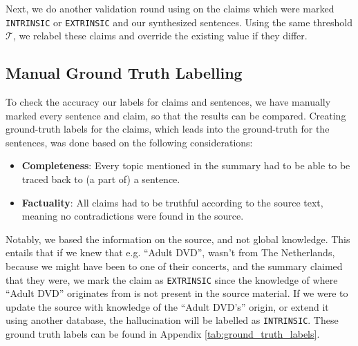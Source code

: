 \noindent Next, we do another validation round using \rob on the claims which were marked \texttt{INTRINSIC} or \texttt{EXTRINSIC} and our synthesized sentences. Using the same threshold $\mathcal{T}$, we relabel these claims and override the existing value if they differ. 

\subsection{Manual Ground Truth Labelling}
To check the accuracy our labels for claims and sentences, we have manually marked every sentence and claim, so that the results can be compared. Creating ground-truth labels for the claims, which leads into the ground-truth for the sentences, was done based on the following considerations:
\begin{itemize}
    \item  \textbf{Completeness}: Every topic mentioned in the summary had to be able to be traced back to (a part of) a sentence.
    \item \textbf{Factuality}: All claims had to be truthful according to the source text, meaning no contradictions were found in the source.
\end{itemize} 
\noindent Notably, we based the information on the source, and not global knowledge. This entails that if we knew that e.g. ``Adult DVD'', wasn't from The Netherlands, because we might have been to one of their concerts, and the summary claimed that they were, we mark the claim as \texttt{EXTRINSIC} since the knowledge of where ``Adult DVD'' originates from is not present in the source material. If we were to update the source with knowledge of the ``Adult DVD's'' origin, or extend it using another database, the hallucination will be labelled as \texttt{INTRINSIC}. These ground truth labels can be found in Appendix \ref{tab:ground_truth_labels}.  

